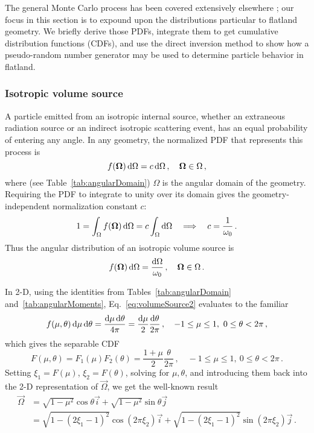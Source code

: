 The general Monte Carlo process has been covered extensively elsewhere
\cite{Lew1984,Bro2004a}; our focus in this section is to expound upon the
distributions particular to flatland geometry. We briefly derive those PDFs,
integrate them to get cumulative distribution functions
(CDFs), and use the direct inversion method to show how a pseudo-random number
generator may be used to determine particle behavior in flatland.

\subsubsection{Isotropic volume source}
A particle emitted from an isotropic internal source, whether an extraneous
radiation source or an indirect isotropic scattering event, has an equal
probability of entering any angle. In any geometry, the normalized PDF that
represents this process is
\begin{equation}\label{eq:volumeSource1}
  f(\bm{\Omega}) \mathop{}\!\mathrm{d} \Omega = c \mathop{}\!\mathrm{d} \Omega \,,
  \quad \bm{\Omega} \in \Omega \,,
\end{equation}
where (see Table~\ref{tab:angularDomain}) $\Omega$ is the angular domain of the
geometry.
Requiring the PDF to integrate to unity over its domain gives the
geometry-independent normalization constant $c$:
\begin{align*}
  1 = \int_{\Omega} f(\bm{\Omega}) \mathop{}\!\mathrm{d}\Omega
  = c \int_{\Omega} \mathop{}\!\mathrm{d}\Omega
  \quad \Longrightarrow \quad
  c = \frac{1}{\omega_0}\,.
\end{align*}
Thus the angular distribution of an isotropic volume source is
\begin{equation}\label{eq:volumeSource2}
  f(\bm{\Omega}) \mathop{}\!\mathrm{d} \Omega = \frac{\mathop{}\!\mathrm{d}\Omega}{\omega_0} \,,
  \quad \bm{\Omega} \in \Omega\,.
\end{equation}

In 2-D, using the identities from Tables~\ref{tab:angularDomain}
and~\ref{tab:angularMoments}, Eq.~\eqref{eq:volumeSource2} evaluates to the
familiar
\begin{equation*}
  f(\mu,\theta) \mathop{}\!\mathrm{d}\mu\mathop{}\!\mathrm{d}\theta = \frac{\mathop{}\!\mathrm{d}\mu\mathop{}\!\mathrm{d}\theta}{4\pi} 
  = \frac{\mathop{}\!\mathrm{d}\mu}{2}\frac{\mathop{}\!\mathrm{d}\theta}{2\pi}
  \,,
  \quad -1\le \mu \le 1,\ 0 \le \theta < 2\pi\,,
\end{equation*}
which gives the separable CDF
\begin{equation*}
  F(\mu,\theta) = F_1(\mu) F_2(\theta)
  = \frac{1 + \mu}{2}\frac{\theta}{2\pi}\,,
  \quad -1\le \mu \le 1,\ 0 \le \theta < 2\pi\,.
\end{equation*}
Setting $\xi_1 = F(\mu)$, $\xi_2 = F(\theta)$, solving for $\mu,\theta$, and
introducing them back into the 2-D representation of $\vec{\Omega}$, we get the
well-known result
\begin{align*}
  \vec{\Omega} &= \sqrt{1-\mu^2} \cos \theta \vec{i}
  + \sqrt{1-\mu^2} \sin \theta \vec{j}
\\
  &= \sqrt{1-(2\xi_1-1)^2} \cos(2\pi\xi_2) \vec{i}
  + \sqrt{1-(2\xi_1-1)^2} \sin(2\pi\xi_2) \vec{j}\,.
\end{align*}

